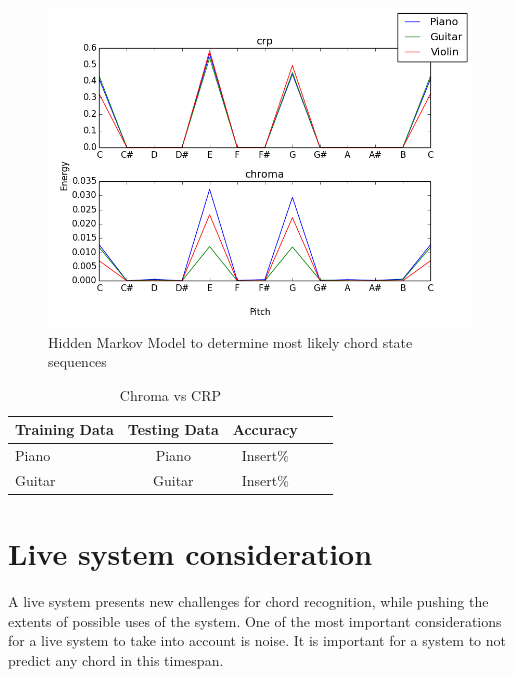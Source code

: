 \documentclass{article}
\begin{document}
\begin{figure}[ht]
\vskip 0.2in
\begin{center}
\centerline{\includegraphics[width=\columnwidth]{chromacrp}}
\caption{Hidden Markov Model to determine most likely chord state sequences}
\label{icml-historical}
\end{center}
\vskip -0.2in
\end{figure}

\begin{table}[t]
\caption{Chroma vs CRP}
\label{chromavscrp}
\vskip 0.15in
\begin{center}
\begin{small}
\begin{sc}
\begin{tabular}{lcccr}
\hline
\abovespace\belowspace
Training Data & Testing Data & Accuracy \\
\hline
\abovespace
Piano & Piano & Insert\%\\
Guitar & Guitar & Insert\%\\
\hline
\end{tabular}
\end{sc}
\end{small}
\end{center}
\vskip -0.1in
\end{table}

\section{Live system consideration}

A live system presents new challenges for chord recognition, while pushing the
extents of possible uses of the system.
One of the most important considerations for a live system to take into account
is noise. It is important for a system to not predict any chord in this
timespan.
\end{document}
